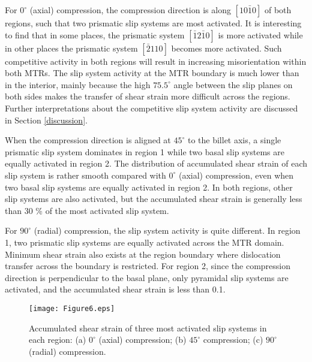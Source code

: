 \documentclass[review]{elsarticle}
\begin{document}
	For $0^{\circ}$ (axial) compression, the compression direction is along $[10\bar{1}0]$ of both regions, such that two prismatic slip systems are most activated.
	It is interesting to find that in some places, the prismatic system $[\bar{1}2\bar{1}0]$ is more activated while in other places the prismatic system $[\bar{2}110]$ becomes more activated.
	Such competitive activity in both regions will result in increasing misorientation within both MTRs.
	The slip system activity at the MTR boundary is much lower than in the interior, mainly because the high $75.5^{\circ}$ angle between the slip planes on both sides makes the transfer of shear strain more difficult across the regions.
	Further interpretations about the competitive slip system activity are discussed in Section \ref{discussion}.
	
	When the compression direction is aligned at $45^{\circ}$ to the billet axis, a single prismatic slip system dominates in region 1 while two basal slip systems are equally activated in region 2.
	The distribution of accumulated shear strain of each slip system is rather smooth compared with $0^{\circ}$ (axial) compression, even when two basal slip systems are equally activated in region 2.
	In both regions, other slip systems are also activated, but the accumulated shear strain is generally less than 30 \% of the most activated slip system.
	
	For $90^{\circ}$ (radial) compression, the slip system activity is quite different.
	In region 1, two prismatic slip systems are equally activated across the MTR domain.
	Minimum shear strain also exists at the region boundary where dislocation transfer across the boundary is restricted.
	For region 2, since the compression direction is perpendicular to the basal plane, only pyramidal slip systems are activated, and the accumulated shear strain is less than 0.1.
	\begin{figure}[!htb]
	\centering
	\texttt{[image: Figure6.eps]}
	\caption{\label{fig:5}Accumulated shear strain of three most activated slip systems in each region: (a) $0^{\circ}$ (axial) compression; (b) $45^{\circ}$ compression; (c) $90^{\circ}$ (radial) compression.}
	\end{figure}
\end{document}
